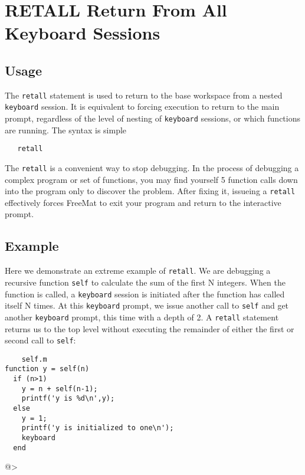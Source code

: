 \section{RETALL Return From All Keyboard Sessions}

\subsection{Usage}

The \verb|retall| statement is used to return to the base workspace
from a nested \verb|keyboard| session.  It is equivalent to forcing
execution to return to the main prompt, regardless of the level
of nesting of \verb|keyboard| sessions, or which functions are 
running.  The syntax is simple
\begin{verbatim}
   retall
\end{verbatim}
The \verb|retall| is a convenient way to stop debugging.  In the
process of debugging a complex program or set of functions,
you may find yourself 5 function calls down into the program
only to discover the problem.  After fixing it, issueing
a \verb|retall| effectively forces FreeMat to exit your program
and return to the interactive prompt.
\subsection{Example}

Here we demonstrate an extreme example of \verb|retall|.  We
are debugging a recursive function \verb|self| to calculate the sum
of the first N integers.  When the function is called,
a \verb|keyboard| session is initiated after the function
has called itself N times.  At this \verb|keyboard| prompt,
we issue another call to \verb|self| and get another \verb|keyboard|
prompt, this time with a depth of 2.  A \verb|retall| statement
returns us to the top level without executing the remainder
of either the first or second call to \verb|self|:
\begin{verbatim}
    self.m
function y = self(n)
  if (n>1)
    y = n + self(n-1);
    printf('y is %d\n',y);
  else
    y = 1;
    printf('y is initialized to one\n');
    keyboard
  end
\end{verbatim}
@>
